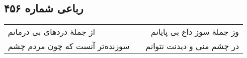 \begin{center}
\section*{رباعی شماره ۴۵۶}
\label{sec:sh456}
\begin{longtable}{l p{0.5cm} r}
از جملهٔ دردهای بی درمانم
&&
وز جملهٔ سوز داغ بی پایانم
\\
سوزنده‌تر آنست که چون مردم چشم
&&
در چشم منی و دیدنت نتوانم
\\
\end{longtable}
\end{center}
